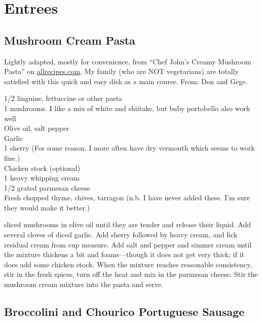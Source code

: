 \chapter{Entrees}

\section{Mushroom Cream Pasta
}

\begin{open}
    Lightly adapted, mostly for convenience, from ``Chef John's Creamy Mushroom
    Pasta'' on \url{allrecipes.com}, My family (who are NOT vegetarians) are
    totally satisfied with this quick and easy dish as a main course. From: Don
    and Gege.
\end{open}
\begin{ingredients}
    \SI{1/2}{\pound} linguine, fettuccine or other pasta\\
    \SI{1}{\pound} mushrooms. I like a mix of white and shiitake, but baby
    portobello also work well\\
    Olive oil, salt pepper\\
    Garlic\\
    \SI{1}{\tblspoon} sherry (For some reason, I more often have dry vermouth
    which seems to work fine.) \\
    Chicken stock (optional)\\
    \SI{1}{\cup} heavy whipping cream\\
    \SI{1/2}{\cup} grated parmesan cheese\\
    Fresh chopped thyme, chives, tarragon (n.b. I have never added these. I'm
    sure  they would make it better.)
\end{ingredients}
\Saute sliced mushrooms in olive oil until they are tender and release their
liquid. Add several cloves of diced garlic. Add sherry followed by heavy cream,
and lick residual cream from cup measure. Add salt and pepper and simmer cream
until the mixture thickens a bit and foams---though it does not get very thick;
if it does add some chicken stock. When the mixture reaches reasonable
consistency, stir in the fresh spices, turn off the heat and mix in the parmesan
cheese. Stir the mushroom cream mixture into the pasta and serve.

\section{Broccolini and Chourico Portuguese Sausage}

